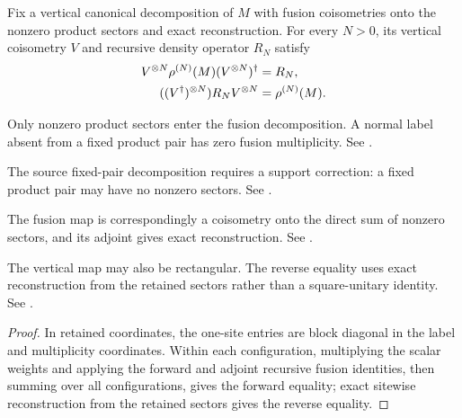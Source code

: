 \begin{lemma}%
    \label{thm:mpdo_fusion_clause_topological_density_decomposition}
    \leanok
    Fix a vertical canonical decomposition of $M$ with fusion coisometries
    onto the nonzero product sectors and exact reconstruction.
    For every $N>0$, its vertical coisometry $V$ and
    recursive density operator $R_N$ satisfy
    \begin{align}
        V^{\otimes N}\rho^{(N)}(M)(V^{\otimes N})^\dagger
         & =R_N,
        \notag             \\
        ((V^\dagger)^{\otimes N})R_NV^{\otimes N}
         & =\rho^{(N)}(M).
        \notag
    \end{align}

    Only nonzero product sectors enter the fusion decomposition. A normal
    label absent from a fixed product pair has zero fusion multiplicity. See
    \cite{gap:cpsv16_bnt_uniqueness_zero_coefficient}.

    The source fixed-pair decomposition requires a support correction:
    a fixed product pair may have no nonzero sectors. See
    \cite{gap:cpsv16_figure11_per_pair_support}.

    The fusion map is correspondingly a coisometry onto the direct sum of
    nonzero sectors, and its adjoint gives exact reconstruction. See
    \cite{gap:cpsv16_figure11_fusion_coisometry}.

    The vertical map may also be rectangular. The reverse equality uses
    exact reconstruction from the retained sectors rather than a
    square-unitary identity. See
    \cite{gap:cpgsv17_vertical_isometry_zero_sector}.
\end{lemma}
\begin{proof}\leanok
    In retained coordinates, the one-site entries are block diagonal in the
    label and multiplicity coordinates. Within each configuration, multiplying
    the scalar weights and applying the forward and adjoint recursive fusion
    identities, then summing over all configurations, gives the forward
    equality; exact sitewise reconstruction from the retained sectors gives
    the reverse equality.
\end{proof}


